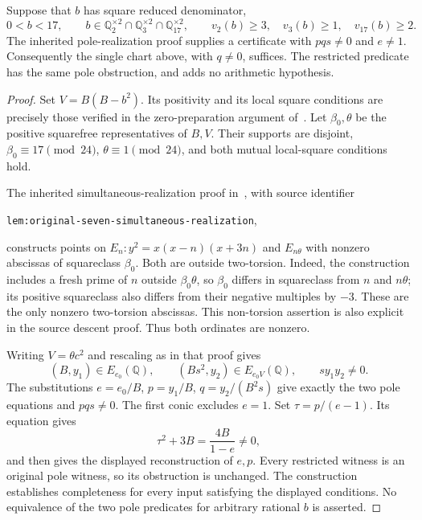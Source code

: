 \documentclass[11pt,a4paper]{article}
\newcommand{\Q}{\mathbb Q}\newcommand{\Z}{\mathbb Z}
\begin{document}
\begin{lemma}\label{lem:pole-chart}
Suppose that $b$ has square reduced denominator,
\[
 0<b<17,\qquad b\in\Q_2^{\times2}\cap\Q_3^{\times2}
 \cap\Q_{17}^{\times2},\qquad
 v_2(b)\ge3,\quad v_3(b)\ge1,\quad v_{17}(b)\ge2.
\]
The inherited pole-realization proof supplies a certificate with
$pqs\ne0$ and $e\ne1$. Consequently the single chart above,
with $q\ne0$, suffices. The restricted predicate has the same
pole obstruction, and adds no arithmetic hypothesis.
\end{lemma}
\begin{proof}
Set $V=B(B-b^2)$. Its positivity and its local square conditions
are precisely those verified in the zero-preparation argument
of~\cite{Dependencies}. Let $\beta_0,\theta$ be the positive
squarefree representatives of $B,V$. Their supports are disjoint,
$\beta_0\equiv17\pmod{24}$, $\theta\equiv1\pmod{24}$, and
both mutual local-square conditions hold.

The inherited simultaneous-realization proof in~\cite{Glazer},
with source identifier
\begin{center}\small
\texttt{lem:original-seven-simultaneous-realization},
\end{center}
constructs points on $E_n:y^2=x(x-n)(x+3n)$ and $E_{n\theta}$ with nonzero
abscissas of squareclass $\beta_0$. Both are outside two-torsion.
Indeed, the construction includes a fresh prime of $n$ outside
$\beta_0\theta$, so $\beta_0$ differs in squareclass from $n$
and $n\theta$; its positive squareclass also differs from their
negative multiples by $-3$. These are the only nonzero two-torsion
abscissas. This non-torsion assertion is also explicit in the
source descent proof. Thus both ordinates are nonzero.

Writing $V=\theta c^2$ and rescaling as in that proof gives
\[
       (B,y_1)\in E_{e_0}(\Q),\qquad
       (Bs^2,y_2)\in E_{e_0V}(\Q),\qquad sy_1y_2\ne0.
\]
The substitutions $e=e_0/B$, $p=y_1/B$, $q=y_2/(B^2s)$
give exactly the two pole equations and $pqs\ne0$. The first
conic excludes $e=1$. Set $\tau=p/(e-1)$. Its equation gives
\[
       \tau^2+3B=\frac{4B}{1-e}\ne0,
\]
and then gives the displayed reconstruction of $e,p$.
Every restricted witness is an original pole witness, so its
obstruction is unchanged. The construction establishes completeness
for every input satisfying the displayed conditions. No equivalence
of the two pole predicates for arbitrary rational $b$ is asserted.
\end{proof}
\end{document}
